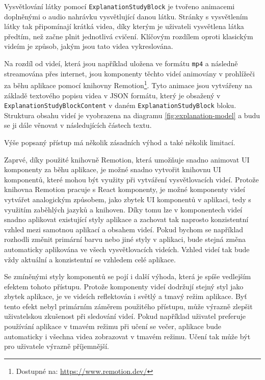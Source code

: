 Vysvětlování látky pomocí \texttt{ExplanationStudyBlock} je tvořeno animacemi doplněnými o audio nahrávku vysvětlující danou látku. Stránky s vysvětlením látky tak připomínají krátká videa, díky kterým je uživateli vysvětlena látka předtím, než začne plnit jednotlivá cvičení. Klíčovým rozdílem oproti klasickým videím je způsob, jakým jsou tato videa vykreslována.

Na rozdíl od videí, která jsou například uložena ve formátu \texttt{mp4} a následně streamována přes internet, jsou komponenty těchto videí animovány v prohlížeči za běhu aplikace pomocí knihovny Remotion\footnote{Dostupné na: \href{https://www.remotion.dev/}{https://www.remotion.dev/}}. Tyto animace jsou vytvářeny na základě textového popisu videa v JSON formátu, který je obsažený v \texttt{ExplanationStudyBlockContent} v daném \texttt{ExplanationStudyBlock} bloku. Struktura obsahu videí je vyobrazena na diagramu \ref{fig:explanation-model} a budu se ji dále věnovat v následujících částech textu.

Výše popsaný přístup má několik zásadních výhod a také několik limitací.

Zaprvé, díky použité knihovně Remotion, která umožňuje snadno animovat UI komponenty za běhu aplikace, je možné snadno vytvořit knihovnu UI komponentů, které mohou být využity při vytváření vysvětlovacích videí. Protože knihovna Remotion pracuje s React komponenty, je možné komponenty videí vytvářet analogickým způsobem, jako zbytek UI komponentů v aplikaci, tedy s využitím zaběhlých jazyků a knihoven. Díky tomu lze v komponentech videí snadno aplikovat existující styly aplikace a zachovat tak naprosto konzistentní vzhled mezi samotnou aplikací a obsahem videí. Pokud bychom se například rozhodli změnit primární barvu nebo jiné styly v aplikaci, bude stejná změna automaticky aplikována ve všech vysvětlovacích videích. Vzhled videí tak bude vždy aktuální a konzistentní se vzhledem celé aplikace.

Se zmíněnými styly komponentů se pojí i další výhoda, která je spíše vedlejším efektem tohoto přístupu. Protože komponenty videí dodržují stejný styl jako zbytek aplikace, je ve videích reflektován i světlý a tmavý režim aplikace. Byť tento efekt nebyl primárním záměrem použitého přístupu, může výrazně zlepšit uživatelskou zkušenost při sledování videí. Pokud například uživatel preferuje používání aplikace v tmavém režimu při učení se večer, aplikace bude automaticky i všechna videa zobrazovat v tmavém režimu. Učení tak může být pro uživatele výrazně příjemnější.

